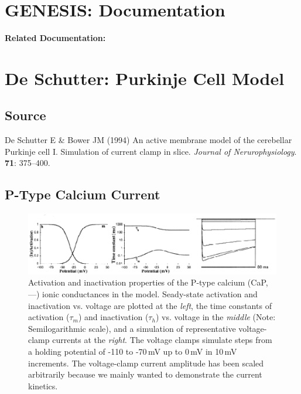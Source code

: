 \documentclass[12pt]{article}
\begin{document}
\section*{GENESIS: Documentation}

{\bf Related Documentation:}

\section*{De Schutter: Purkinje Cell Model}

\subsection*{Source}

De Schutter E \& Bower JM (1994) An active membrane model of the cerebellar Purkinje cell I. Simulation of current clamp in slice. {\it Journal of Nerurophysiology}. {\bf 71}: 375--400. \\

\subsection*{P-Type Calcium Current}

\begin{figure}[h]
\centering
   \includegraphics[scale=0.75]{figures/DS1.2C.eps}
   \caption{Activation and inactivation properties of the P-type calcium (CaP, ---) ionic conductances in the model. Seady-state activation and inactivation vs. voltage are plotted at the {\em left}, the time constants of activation ($\tau_m$) and inactivation ($\tau_h$) vs. voltage in the {\em middle} (Note: Semilogarithmic scale), and a simulation of representative voltage-clamp currents at the {\em right}. The voltage clamps simulate steps from a holding potential of -110 to -70\,mV up to 0\,mV in 10\,mV increments. The voltage-clamp current amplitude has been scaled arbitrarily because we mainly wanted to demonstrate the current kinetics.}
   \label{fig:DS1.2C}
\end{figure}
\end{document}
